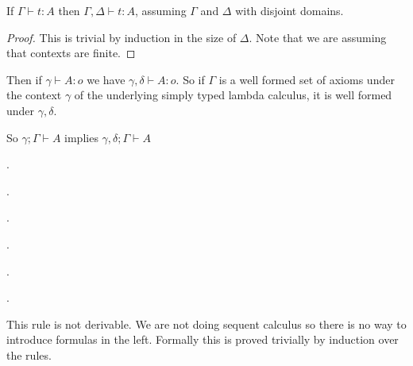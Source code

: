 \begin{lemma}
  If $\Gamma \vdash t : A$ then $\Gamma,\Delta \vdash t : A$, assuming
  $\Gamma$ and $\Delta$ with disjoint domains.  
\end{lemma}

\begin{proof}
  This is trivial by induction in the size of $\Delta$. Note that we
  are assuming that contexts are finite.
\end{proof}

Then if $\gamma \vdash A : o $ we have
$\gamma,\delta \vdash A : o $. So if $\Gamma$ is a well formed
set of axioms under the context $\gamma$ of the underlying simply typed
lambda calculus, it is well formed under $\gamma, \delta$.

So $\gamma; \Gamma \vdash A$ implies $\gamma,\delta; \Gamma \vdash A$


.

.

.

.

.

.


This rule is not derivable. We are not doing sequent calculus so there
is no way to introduce formulas in the left. Formally this is proved
trivially by induction over the rules.

